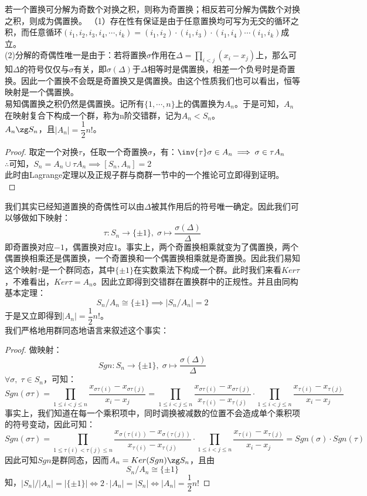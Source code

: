 若一个置换可分解为奇数个对换之积，则称为奇置换；相反若可分解为偶数个对换之积，则成为偶置换。
（1）存在性有保证是由于任意置换均可写为无交的循环之积，而任意循环$(i_1,i_2,i_3,i_4,\cdots,i_k)=(i_1,i_2)\cdot(i_1,i_3)\cdot(i_1,i_4)\cdots(i_1,i_k)$成立。\\
(2)分解的奇偶性唯一是由于：若将置换$\sigma$作用在$\Delta=\prod_{i<j}(x_i-x_j)$上，那么可知$\Delta$的符号仅仅与$\sigma$有关，即$\sigma(\Delta)$于$\Delta$相等时是偶置换，相差一个负号时是奇置换。因此一个置换不会既是奇置换又是偶置换。由这个性质我们也可以看出，恒等映射是一个偶置换。\\
易知偶置换之积仍然是偶置换。记所有$\{1,\cdots,n\}$上的偶置换为$A_n$。于是可知，$A_n$在映射复合下构成一个群，称为n阶交错群，记为$A_n<S_n$。\\
$A_n\zg S_n$，且$|A_n|=\dfrac{1}{2}n!$。\\
\begin{proof}
取定一个对换$\tau$，任取一个奇置换$\sigma$，有：$\inv{\tau}\sigma\in A_n\implies \sigma\in \tau A_n$\\
$\therefore$可知，$S_n=A_n\cup \tau A_n\implies[S_n,A_n]=2$\\
此时由Lagrange定理以及正规子群与商群一节中的一个推论可立即得到证明。\\
\end{proof}
我们其实已经知道置换的奇偶性可以由$\Delta$被其作用后的符号唯一确定。因此我们可以够做如下映射：
\[
\tau\colon S_n\to \{\pm1\},\; \sigma\mapsto \frac{\sigma(\Delta)}{\Delta}
\]
即奇置换对应$-1$，偶置换对应$1$。事实上，两个奇置换相乘就变为了偶置换，两个偶置换相乘还是偶置换，一个奇置换和一个偶置换相乘就是奇置换。因此我们易知这个映射$\tau$是一个群同态，其中$\{\pm1\}$在实数乘法下构成一个群。此时我们来看$Ker\tau$，不难看出，$Ker\tau=A_n$。因此立即得到交错群在置换群中的正规性。并且由同构基本定理：
\[
S_n/A_n\cong \{\pm1\}\implies |S_n/A_n|=2
\]
于是又立即得到$|A_n|=\dfrac{1}{2}n!$。\\
我们严格地用群同态地语言来叙述这个事实：
\begin{proof}
做映射：
\[
Sgn\colon S_n\to \{\pm 1\},\; \sigma \mapsto \frac{\sigma(\Delta)}{\Delta}
\]
$\forall \sigma,\; \tau\in S_n$，可知：
\[
Sgn(\sigma\tau)=\prod_{1\leq i<j\leq n}\frac{x_{\sigma\tau(i)}-x_{\sigma\tau(j)}}{x_i-x_j}=\prod_{1\leq i<j\leq n}\frac{x_{\sigma\tau(i)}-x_{\sigma\tau(j)}}{x_{\tau(i)}-x_{\tau(j)}}\cdot\prod_{1\leq i<j\leq n}\frac{x_{\tau(i)}-x_{\tau(j)}}{x_i-x_j}
\]
事实上，我们知道在每一个乘积项中，同时调换被减数的位置不会造成单个乘积项的符号变动，因此可知：
\[
Sgn(\sigma\tau)=\prod_{1\leq \tau(i)<\tau(j)\leq n}\frac{x_{\sigma(\tau(i))}-x_{\sigma(\tau(j))}}{x_{\tau(i)}-x_{\tau(j)}}\cdot\prod_{1\leq i<j\leq n}\frac{x_{\tau(i)}-x_{\tau(j)}}{x_i-x_j}=Sgn(\sigma)\cdot Sgn(\tau)
\]
因此可知$Sgn$是群同态，因而$A_n=Ker(Sgn)\zg S_n$，且由
\[
S_n/A_n\cong \{\pm 1\}
\]
知，$|S_n|/|A_n|=|\{\pm 1\}|\iff 2\cdot |A_n|=|S_n|\iff |A_n|=\dfrac{1}{2}n!$
\end{proof}
